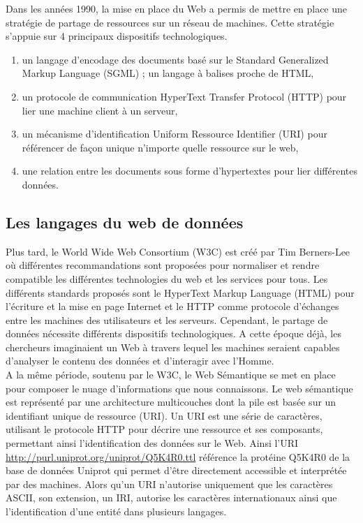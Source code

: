 Dans les années 1990, la mise en place du Web a permis de mettre en place une stratégie de partage de ressources sur un réseau de machines. Cette stratégie s'appuie sur 4 principaux dispositifs technologiques.


\begin{enumerate}
\item un langage d’encodage des documents basé sur le Standard Generalized Markup Language (SGML) ; un langage à balises proche de HTML,
\item un protocole de communication HyperText Transfer Protocol (HTTP) pour lier une machine client à un serveur,
\item un mécanisme d’identification Uniform Ressource Identifier (URI) pour référencer de façon unique n’importe quelle ressource sur le web,
\item une relation entre les documents sous forme d’hypertextes pour lier différentes données.
\end{enumerate}

\subsection{Les langages du web de données}

Plus tard, le World Wide Web Consortium (W3C) est créé par Tim Berners-Lee où différentes recommandations sont proposées pour normaliser et rendre compatible les différentes technologies du web et les services pour tous. Les différents standards proposés sont le HyperText Markup Language (HTML) pour l’écriture et la mise en page Internet et le HTTP comme protocole d’échanges entre les machines des utilisateurs et les serveurs. Cependant, le partage de données nécessite différents dispositifs technologiques. A cette époque déjà, les chercheurs imaginaient un Web à travers lequel les machines seraient capables d’analyser le contenu des données et d'interagir avec l’Homme.\\

A la même période, soutenu par le W3C, le Web Sémantique se met en place pour composer le nuage d’informations que nous connaissons. Le web sémantique est représenté par une architecture multicouches dont la pile est basée sur un identifiant unique de ressource (URI). Un URI est une série de caractères, utilisant le protocole HTTP pour décrire une ressource et ses composants, permettant ainsi l’identification des données sur le Web. Ainsi l’URI \url{http://purl.uniprot.org/uniprot/Q5K4R0.ttl} référence la protéine Q5K4R0 de la base de données Uniprot qui permet d’être directement accessible et interprétée par des machines. Alors qu'un URI n'autorise uniquement que les caractères ASCII, son extension, un IRI, autorise les caractères internationaux ainsi que l'identification d'une entité dans plusieurs langages.\\

